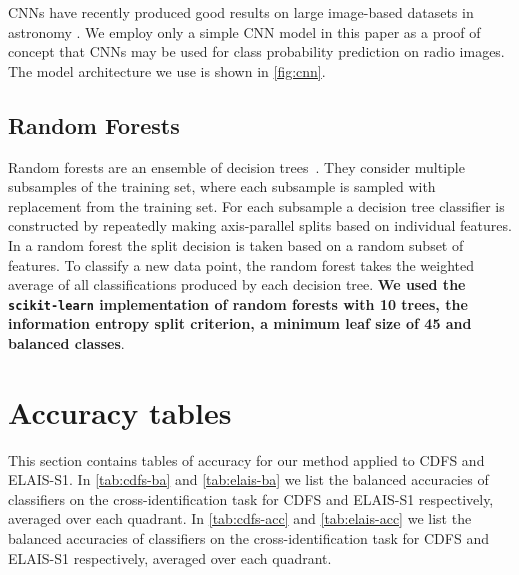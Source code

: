 \documentclass[fleqn,usenatbib,usedcolumn]{mnras}
\newcommand{\edited}[1]{{\bf {#1}}}
\begin{document}
    CNNs have recently produced good results on large image-based datasets in
    astronomy \citep[e.g.]{lukic18compact, dieleman15cnn}. We employ
    only a simple CNN model in this paper as a proof of concept that CNNs may
    be used for class probability prediction on radio images. The model
    architecture we use is shown in \autoref{fig:cnn}.

  \subsection{Random Forests}
  \label{sec:random-forests}

    Random forests are an ensemble of decision
    trees~\citep{breiman01random-forest}. They consider multiple subsamples of
    the training set, where each subsample is sampled with replacement from
    the training set. For each subsample a decision tree classifier is
    constructed by repeatedly making axis-parallel splits based on individual
    features. In a random forest the split decision is taken based on a random
    subset of features. To classify a new data point, the random forest takes
    the weighted average of all classifications produced by each decision
    tree. \edited{We used the \texttt{scikit-learn} \citep{pedregosa11sklearn}
    implementation of random forests with 10 trees, the information entropy
    split criterion, a minimum leaf size of 45 and balanced classes}.

\section{Accuracy tables}\label{app:accuracies}
  
  This section contains tables of accuracy for our method applied to CDFS and
  ELAIS-S1. In \autoref{tab:cdfs-ba} and \autoref{tab:elais-ba} we list the
  balanced accuracies of classifiers on the cross-identification task for CDFS
  and ELAIS-S1 respectively, averaged over each quadrant. In
  \autoref{tab:cdfs-acc} and \autoref{tab:elais-acc} we list the balanced
  accuracies of classifiers on the cross-identification task for CDFS and
  ELAIS-S1 respectively, averaged over each quadrant.
\end{document}
